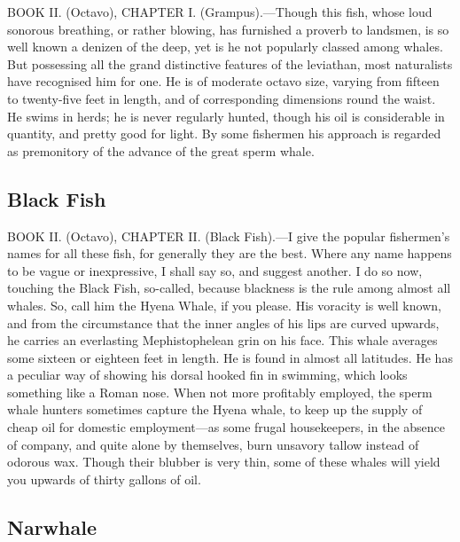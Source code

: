 BOOK II. (Octavo), CHAPTER I. (Grampus).—Though this fish, whose loud sonorous breathing, or rather blowing, has furnished a proverb to landsmen, is so well known a denizen of the deep, yet is he not popularly classed among whales. But possessing all the grand distinctive features of the leviathan, most naturalists have recognised him for one. He is of moderate octavo size, varying from fifteen to twenty-five feet in length, and of corresponding dimensions round the waist. He swims in herds; he is never regularly hunted, though his oil is considerable in quantity, and pretty good for light. By some fishermen his approach is regarded as premonitory of the advance of the great sperm whale.

\subsection{Black Fish}

BOOK II. (Octavo), CHAPTER II. (Black Fish).—I give the popular fishermen’s names for all these fish, for generally they are the best. Where any name happens to be vague or inexpressive, I shall say so, and suggest another. I do so now, touching the Black Fish, so-called, because blackness is the rule among almost all whales. So, call him the Hyena Whale, if you please. His voracity is well known, and from the circumstance that the inner angles of his lips are curved upwards, he carries an everlasting Mephistophelean grin on his face. This whale averages some sixteen or eighteen feet in length. He is found in almost all latitudes. He has a peculiar way of showing his dorsal hooked fin in swimming, which looks something like a Roman nose. When not more profitably employed, the sperm whale hunters sometimes capture the Hyena whale, to keep up the supply of cheap oil for domestic employment—as some frugal housekeepers, in the absence of company, and quite alone by themselves, burn unsavory tallow instead of odorous wax. Though their blubber is very thin, some of these whales will yield you upwards of thirty gallons of oil.

\subsection{Narwhale}

